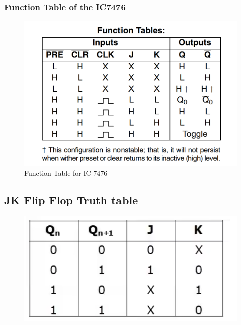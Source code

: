 \documentclass[11pt]{article}
\begin{document}
\subsubsection{Function Table of the IC7476}
\begin{figure}[H]
	\centering
	\includegraphics[scale = 0.5]{7476 function table.png}
	\caption{Function Table for IC 7476}
\end{figure}


\subsection{JK Flip Flop Truth table}
\begin{figure}[H]
	\centering
	\includegraphics[scale = 0.5]{jk flip flop truth table.png}
\end{figure}
\end{document}
